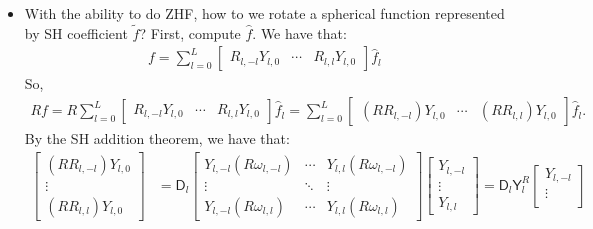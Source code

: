 \documentclass[10pt]{article}
\begin{document}
\begin{itemize}
        \item With the ability to do ZHF, how to we rotate a spherical function represented by SH coefficient $\tilde{f}$?
        First, compute $\hat{f}$.  We have that:
        \begin{align*}
            f = \sum_{l=0}^L \begin{bmatrix}
                R_{l,-l} Y_{l,0} & \cdots & R_{l,l} Y_{l,0}
            \end{bmatrix}
            \hat{f}_l
        \end{align*}
        So,
        \begin{align*}
            Rf = R \sum_{l=0}^L \begin{bmatrix}
                R_{l,-l} Y_{l,0} & \cdots & R_{l,l} Y_{l,0}
            \end{bmatrix}
            \hat{f}_l
            = \sum_{l=0}^L \begin{bmatrix}
                (R R_{l,-l}) Y_{l,0} & \cdots & (R R_{l,l}) Y_{l,0}
            \end{bmatrix}
            \hat{f}_l.
        \end{align*}
        By the SH addition theorem, we have that:
        \begin{align*}
            \begin{bmatrix}
                (RR_{l,-l}) Y_{l,0} \\
                \vdots \\
                (RR_{l,l}) Y_{l,0}
            \end{bmatrix}
            &=
            \mathsf{D}_l
            \begin{bmatrix}
                Y_{l,-l}(R\omega_{l,-l}) & \cdots & Y_{l,l}(R\omega_{l,-l}) \\
                \vdots & \ddots & \vdots \\
                Y_{l,-l}(R\omega_{l,l}) & \cdots & Y_{l,l}(R\omega_{l,l})
            \end{bmatrix}
            \begin{bmatrix}
                Y_{l,-l} \\
                \vdots \\
                Y_{l,l}
            \end{bmatrix}
            = \mathsf{D}_l
            \mathsf{Y}^R_l
            \begin{bmatrix}
                Y_{l,-l} \\
                \vdots \\

\end{bmatrix}
\end{align*}
\end{itemize}
\end{document}
